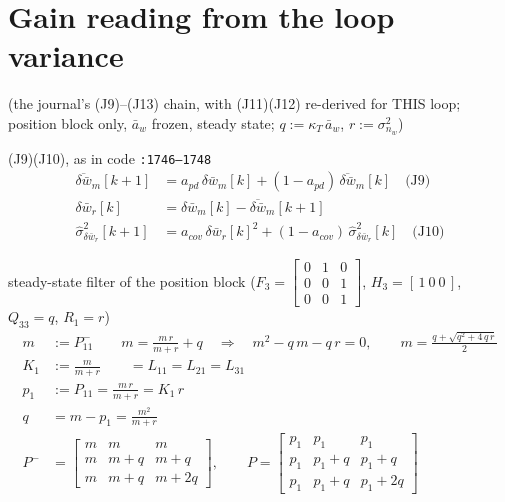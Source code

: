\documentclass[11pt,a4paper,fontset=none]{ctexart}
\newcommand{\ba}{\bar{a}}
\newcommand{\bw}{\bar{w}}
\newcommand{\J}[1]{\quad\text{(J#1)}}
\begin{document}
\section{Gain reading from the loop variance}

(the journal's (J9)--(J13) chain, with (J11)(J12) re-derived for THIS loop; position block only, $\ba_w$ frozen, steady state;
$q := \kappa_T\,\ba_w$, $r := \sigma^{2}_{n_w}$)

(J9)(J10), as in code \texttt{:1746--1748}
\begin{align*}
\overline{\delta\bw}_m[k+1] &= a_{pd}\,\delta\bw_m[k] + (1 - a_{pd})\,\overline{\delta\bw}_m[k] \J{9} \\
\delta\bw_r[k]              &= \delta\bw_m[k] - \overline{\delta\bw}_m[k+1] \\
\hat\sigma^{2}_{\delta\bw_r}[k+1] &= a_{cov}\,\delta\bw_r[k]^{2} + (1 - a_{cov})\,\hat\sigma^{2}_{\delta\bw_r}[k] \J{10}
\end{align*}

steady-state filter of the position block ($F_3 = \begin{bmatrix} 0&1&0\\0&0&1\\0&0&1 \end{bmatrix}$, $H_3 = [\,1\ 0\ 0\,]$, $Q_{33} = q$, $R_1 = r$)
\begin{align*}
m   &:= P^{-}_{11} \qquad m = \frac{m\,r}{m + r} + q \quad\Longrightarrow\quad m^{2} - q\,m - q\,r = 0,\qquad m = \frac{q + \sqrt{q^{2} + 4\,q\,r}}{2} \\
K_1 &:= \frac{m}{m + r} \qquad = L_{11} = L_{21} = L_{31} \\
p_1 &:= P_{11} = \frac{m\,r}{m + r} = K_1\,r \\
q   &= m - p_1 = \frac{m^{2}}{m + r} \\[4pt]
P^{-} &= \begin{bmatrix} m & m & m \\ m & m+q & m+q \\ m & m+q & m+2q \end{bmatrix}, \qquad
P = \begin{bmatrix} p_1 & p_1 & p_1 \\ p_1 & p_1+q & p_1+q \\ p_1 & p_1+q & p_1+2q \end{bmatrix}
\end{align*}
\end{document}
